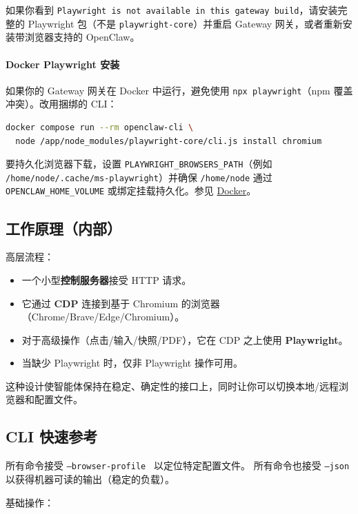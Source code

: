 如果你看到 \texttt{Playwright is not available in this gateway build}，请安装完整的 Playwright 包（不是 \texttt{playwright-core}）并重启 Gateway 网关，或者重新安装带浏览器支持的 OpenClaw。

\paragraph{Docker Playwright 安装}


如果你的 Gateway 网关在 Docker 中运行，避免使用 \texttt{npx playwright}（npm 覆盖冲突）。改用捆绑的 CLI：

\begin{lstlisting}[language=bash]
docker compose run --rm openclaw-cli \
  node /app/node_modules/playwright-core/cli.js install chromium
\end{lstlisting}


要持久化浏览器下载，设置 \texttt{PLAYWRIGHT\_BROWSERS\_PATH}（例如 \texttt{/home/node/.cache/ms-playwright}）并确保 \texttt{/home/node} 通过 \texttt{OPENCLAW\_HOME\_VOLUME} 或绑定挂载持久化。参见 \href{/install/docker}{Docker}。

\subsection{工作原理（内部）}


高层流程：

\begin{itemize}
  \item 一个小型\textbf{控制服务器}接受 HTTP 请求。
  \item 它通过 \textbf{CDP} 连接到基于 Chromium 的浏览器（Chrome/Brave/Edge/Chromium）。
  \item 对于高级操作（点击/输入/快照/PDF），它在 CDP 之上使用 \textbf{Playwright}。
  \item 当缺少 Playwright 时，仅非 Playwright 操作可用。
\end{itemize}


这种设计使智能体保持在稳定、确定性的接口上，同时让你可以切换本地/远程浏览器和配置文件。

\subsection{CLI 快速参考}


所有命令接受 \texttt{--browser-profile } 以定位特定配置文件。
所有命令也接受 \texttt{--json} 以获得机器可读的输出（稳定的负载）。

基础操作：

